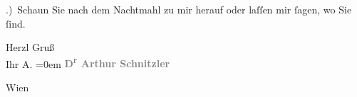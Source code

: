 .) Schaun Sie nach dem Nachtmahl zu mir herauf oder laſſen mir{ }ſagen, wo Sie{ }ſind.\pend
           
\pstart
           Herzl Gruß{\\[\baselineskip]}Ihr \spacefill\mbox{A.}\pend
           \leftskip=0em{}
\pstart
           \noindent{}\centering{}\textcolor{gray}{\textbf{D\textsuperscript{r} Arthur Schnitzler}}\pend
           
\pstart
           \raggedleft{}Wien\pend
           \endnumbering{}  \newcommand{\dateiname}{L00707}\newcommand{\titel}{Arthur Schnitzler an Richard Beer-Hofmann, 20. 7. 1897}\newcommand{\editorInnen}{Martin Anton Müller und Gerd-Hermann Susen}
